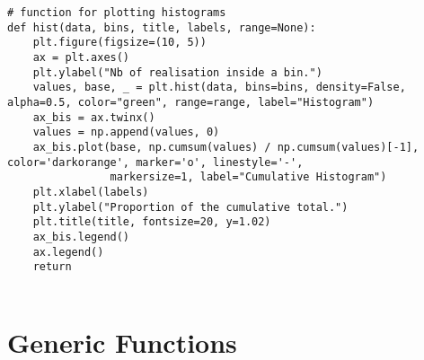 \begin{Verbatim}[fontsize=\tiny]
# function for plotting histograms
def hist(data, bins, title, labels, range=None):
    plt.figure(figsize=(10, 5))
    ax = plt.axes()
    plt.ylabel("Nb of realisation inside a bin.")
    values, base, _ = plt.hist(data, bins=bins, density=False, alpha=0.5, color="green", range=range, label="Histogram")
    ax_bis = ax.twinx()
    values = np.append(values, 0)
    ax_bis.plot(base, np.cumsum(values) / np.cumsum(values)[-1], color='darkorange', marker='o', linestyle='-',
                markersize=1, label="Cumulative Histogram")
    plt.xlabel(labels)
    plt.ylabel("Proportion of the cumulative total.")
    plt.title(title, fontsize=20, y=1.02)
    ax_bis.legend()
    ax.legend()
    return


\end{Verbatim}

\section{Generic Functions}

